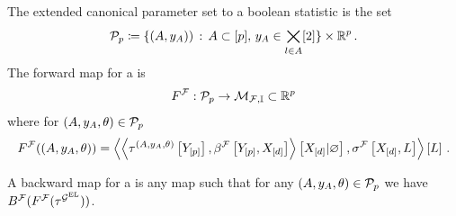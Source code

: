 %



\begin{definition}
    The extended canonical parameter set to a boolean statistic is the set
    \begin{align*}
        \mathcal{P}_{p}\coloneqq
        \{(A,y_{A}))\,:\, A\subset[p],\, y_{A}\in\bigtimes_{l\in A}[2]\} \times \mathbb{R}^{p} \, .
    \end{align*}
    The forward map for a \HybridLogicNetwork{} is
    \begin{align*}
        F^{\mathcal{F}} :  \mathcal{P}_{p}
        \rightarrow \mathcal{M}_{\mathcal{F},\mathbb{I}} \subset \mathbb{R}^{p}
    \end{align*}
    where for $(A,y_{A},\theta)\in\mathcal{P}_{p}$
    \begin{align*}
        F^{\mathcal{F}}((A,y_{A},\theta))
        = \left\langle 
            \left\langle \tau^{(A,y_{A},\theta)}\left[Y_{[p]}\right],\beta^{\mathcal{F}}\left[Y_{[p]},X_{[d]}\right]\right\rangle \left[ X_{[d]} | \varnothing \right]
            ,\sigma^{\mathcal{F}}\left[X_{[d]},L\right]\right\rangle \left[ L \right] \, .
    \end{align*}

    A backward map for a \HybridLogicNetwork{} is any map
    such that for any $(A,y_{A},\theta)\in\mathcal{P}_{p}$ we have $B^{\mathcal{F}}(F^{\mathcal{F}}(\tau^{\mathcal{G}^{\mathrm{EL}}}))$.

\end{definition}

